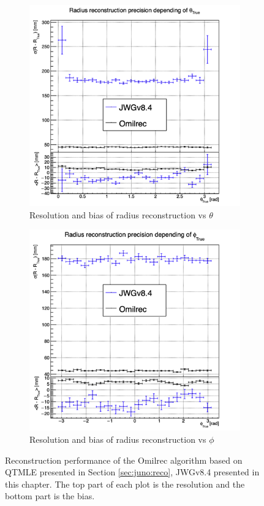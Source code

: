 \documentclass[../main.tex]{subfiles}
\begin{document}
\begin{figure}
  \begin{subfigure}[t]{0.48\linewidth}
    \centering
    \includegraphics[width=\linewidth]{images/jgnn/MSBvTT_nox.png}
    \caption{Resolution and bias of radius reconstruction vs $\theta$}
    \label{fig:jgnn:MSBvTTC_nox}
  \end{subfigure}
  \begin{subfigure}[t]{0.48\linewidth}
    \centering
    \includegraphics[width=\linewidth]{images/jgnn/MSBvPT_nox.png}
    \caption{Resolution and bias of radius reconstruction vs $\phi$}
    \label{fig:jgnn:MSBvPTC_nox}
  \end{subfigure}
  \caption{Reconstruction performance of the Omilrec algorithm based on QTMLE presented in Section \ref{sec:juno:reco}, JWGv8.4 presented in this chapter. The top part of each plot is the resolution and the bottom part is the bias.}
  \label{fig:jgnn:results_nox_3}
\end{figure}
\end{document}
